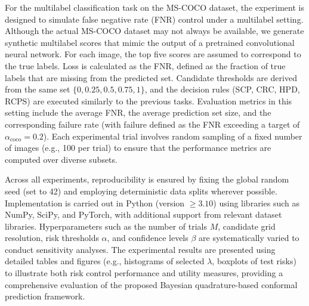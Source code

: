 \documentclass{article} %
\begin{document}
For the multilabel classification task on the MS-COCO dataset, the experiment is designed to simulate false negative rate (FNR) control under a multilabel setting. Although the actual MS-COCO dataset may not always be available, we generate synthetic multilabel scores that mimic the output of a pretrained convolutional neural network. For each image, the top five scores are assumed to correspond to the true labels. Loss is calculated as the FNR, defined as the fraction of true labels that are missing from the predicted set. Candidate thresholds are derived from the same set \(\{0, 0.25, 0.5, 0.75, 1\}\), and the decision rules (SCP, CRC, HPD, RCPS) are executed similarly to the previous tasks. Evaluation metrics in this setting include the average FNR, the average prediction set size, and the corresponding failure rate (with failure defined as the FNR exceeding a target of \(\alpha_{\text{coco}} = 0.2\)). Each experimental trial involves random sampling of a fixed number of images (e.g., 100 per trial) to ensure that the performance metrics are computed over diverse subsets. 

Across all experiments, reproducibility is ensured by fixing the global random seed (set to 42) and employing deterministic data splits wherever possible. Implementation is carried out in Python (version \(\geq 3.10\)) using libraries such as NumPy, SciPy, and PyTorch, with additional support from relevant dataset libraries. Hyperparameters such as the number of trials \(M\), candidate grid resolution, risk thresholds \(\alpha\), and confidence levels \(\beta\) are systematically varied to conduct sensitivity analyses. The experimental results are presented using detailed tables and figures (e.g., histograms of selected \(\lambda\), boxplots of test risks) to illustrate both risk control performance and utility measures, providing a comprehensive evaluation of the proposed Bayesian quadrature-based conformal prediction framework.
\end{document}
